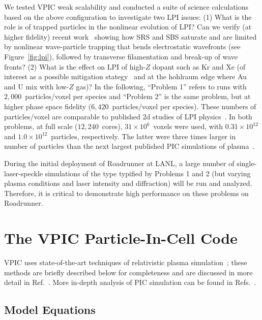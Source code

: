 \documentclass[journal,twoside]{IEEEtran}
\newcommand{\fig}[1]{Figure~\ref{fig:#1}}
\begin{document}
We tested VPIC weak scalability and conducted a suite of science
calculations~\cite{AAC_Conference_Paper} based on the above
configuration to investigate two LPI issues: (1) What is the role is
of trapped particles in the nonlinear evolution of LPI?  Can we verify
(at higher fidelity) recent
work~\cite{Yin_et_al_PRL_2007_SRS,Yin_et_al_Phys_Plasmas_2007_SRS}
showing how SRS and SBS saturate and are limited by nonlinear
wave-particle trapping that bends electrostatic wavefronts (see
\fig{lpi}), followed by transverse filamentation and break-up
of wave fronts?  (2) What is the effect on LPI of high-$Z$ dopant such
as Kr and Xe (of interest as a possible mitigation
stategy~\cite{Lushnikov_PPCF_2006} and at the hohlraum edge where Au
and U mix with low-$Z$ gas)?  In the following, ``Problem 1'' refers
to runs with $2,000$~particles/voxel per species and ``Problem 2'' is
the same problem, but at higher phase space fidelity
($6,420$~particles/voxel per species).  These numbers of
particles/voxel are comparable to published 2d studies of LPI
physics~\cite{Yin_et_al_PRL_2007_SRS,Yin_et_al_Phys_Plasmas_2007_SRS}.
In both problems, at full scale ($12,240$~cores), $31 \times
10^6$~voxels were used, with $0.31 \times 10^{12}$ and $1.0 \times
10^{12}$~particles, respectively.  The latter were three times larger
in number of particles than the next largest published PIC simulations
of plasma~\cite{Yin_et_al_PRL_2007_reconnection}.

During the initial deployment of Roadrunner at LANL, a large number of
single-laser-speckle simulations of the type typified by Problems 1
and 2 (but varying plasma conditions and laser intensity and
diffraction) will be run and analyzed.  Therefore, it is critical to
demonstrate high performance on these problems on Roadrunner.

\section{The VPIC Particle-In-Cell Code}

VPIC uses state-of-the-art techniques of relativistic plasma
simulation~\cite{Blahovec_et_al_2000,Eastwood_et_al_1995,
Jones_et_al_1996,Kwan_Snell_1985,Nieter_Cary_2004,
Verboncoeur_et_al_1995}; these methods are briefly described below for
completeness and are discussed in more detail in
Ref.~\cite{Bowers_et_al_Phys_Plasmas_2007}.  More in-depth analysis of
PIC simulation can be found in
Refs.~\cite{Birdsall_Langdon_1985,Hockney_Eastwood_1988}.

\subsection{Model Equations}
\end{document}
